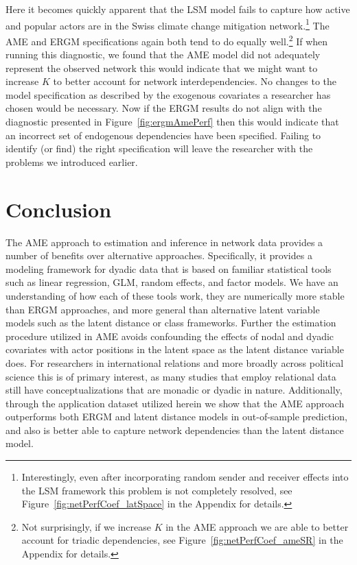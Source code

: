 \documentclass[12pt,onesided,pdflatex]{amsart}
\begin{document}
Here it becomes quickly apparent that the LSM model fails to capture how active and popular actors are in the Swiss climate change mitigation network.\footnote{Interestingly, even after incorporating random sender and receiver effects into the LSM framework this problem is not completely resolved, see Figure~\ref{fig:netPerfCoef_latSpace} in the Appendix for details.} The AME and ERGM specifications again both tend to do equally well.\footnote{Not surprisingly, if we increase $K$ in the AME approach we are able to better account for triadic dependencies, see Figure~\ref{fig:netPerfCoef_ameSR} in the Appendix for details.} If when running this diagnostic, we found that the AME model did not adequately represent the observed network this would indicate that we might want to increase $K$ to better account for network interdependencies. No changes to the model specification as described by the exogenous covariates a researcher has chosen would be necessary. Now if the ERGM results do not align with the diagnostic presented in Figure~\ref{fig:ergmAmePerf} then this would indicate that an incorrect set of endogenous dependencies have been specified. Failing to identify (or find) the right specification will leave the researcher with the problems we introduced earlier.

\section{\textbf{Conclusion}}

The AME approach to estimation and inference in network data provides a number of benefits over alternative approaches. Specifically, it provides a modeling framework for dyadic data that is based on familiar statistical tools such as linear regression, GLM, random effects, and factor models. We have an understanding of how each of these tools work, they are numerically more stable than ERGM approaches, and more general than alternative latent variable models such as the latent distance or class frameworks. Further the estimation procedure utilized in AME avoids confounding the effects of nodal and dyadic covariates with actor positions in the latent space as the latent distance variable does. For researchers in international relations and more broadly across political science this is of primary interest, as many studies that employ relational data still have conceptualizations  that are monadic or dyadic in nature. Additionally, through the application dataset utilized herein we show that the AME approach outperforms both ERGM and latent distance models in out-of-sample prediction, and also is better able to capture network dependencies than the latent distance model. 
\end{document}
